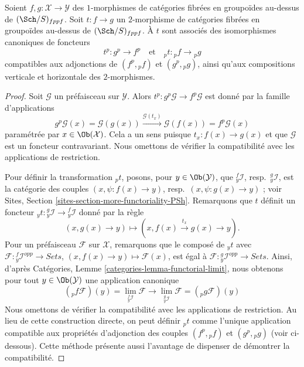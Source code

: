 \begin{lemma}
\label{lemma-2-morphisms-presheaves}
Soient $f, g : \mathcal{X} \to \mathcal{Y}$ des $1$-morphismes de catégories
fibrées en groupoïdes au-dessus de $(\Sch/S)_{fppf}$. Soit $t : f \to g$
un $2$-morphisme de catégories fibrées en groupoïdes au-dessus de
$(\Sch/S)_{fppf}$. À $t$ sont associés des
isomorphismes canoniques de foncteurs
$$
t^p : g^p \longrightarrow f^p
\quad\text{et}\quad
{}_pt : {}_pf \longrightarrow {}_pg
$$
compatibles aux adjonctions de $(f^p, {}_pf)$ et
$(g^p, {}_pg)$, ainsi qu'aux
compositions verticale et horizontale des $2$-morphismes.
\end{lemma}

\begin{proof}
Soit $\mathcal{G}$ un préfaisceau sur $\mathcal{Y}$. Alors
$t^p : g^p\mathcal{G} \to f^p\mathcal{G}$ est donné par la famille
d'applications
$$
g^p\mathcal{G}(x) = \mathcal{G}(g(x))
\xrightarrow{\mathcal{G}(t_x)}
\mathcal{G}(f(x)) = f^p\mathcal{G}(x)
$$
paramétrée par $x \in \Ob(\mathcal{X})$. Cela a un sens puisque
$t_x : f(x) \to g(x)$ et que $\mathcal{G}$ est un foncteur contravariant.
Nous omettons de vérifier la compatibilité avec les applications
de restriction.

\medskip\noindent
Pour définir la transformation ${}_pt$, posons, pour $y \in \Ob(\mathcal{Y})$,
que ${}_y^f\mathcal{I}$, resp.\ ${}_y^g\mathcal{I}$, est la catégorie
des couples $(x, \psi : f(x) \to y)$, resp.\ $(x, \psi : g(x) \to y)$ ; voir
Sites, Section \ref{sites-section-more-functoriality-PSh}.
Remarquons que $t$ définit un foncteur
${}_yt : {}_y^g\mathcal{I} \to {}_y^f\mathcal{I}$
donné par la règle
$$
(x, g(x) \to y) \longmapsto (x, f(x) \xrightarrow{t_x} g(x) \to y).
$$
Pour un préfaisceau $\mathcal{F}$ sur $\mathcal{X}$, remarquons que le composé
de ${}_yt$ avec $\mathcal{F} : {}_y^f\mathcal{I}^{opp} \to \textit{Sets}$,
$(x, f(x) \to y) \mapsto \mathcal{F}(x)$, est égal à
$\mathcal{F} : {}_y^g\mathcal{I}^{opp} \to \textit{Sets}$. Ainsi, d'après
Catégories, Lemme \ref{categories-lemma-functorial-limit},
nous obtenons pour tout $y \in \Ob(\mathcal{Y})$ une application canonique
$$
({}_pf\mathcal{F})(y) = \lim_{{}_y^f\mathcal{I}} \mathcal{F}
\longrightarrow
\lim_{{}_y^g\mathcal{I}} \mathcal{F} = ({}_pg\mathcal{F})(y)
$$
Nous omettons de vérifier la compatibilité avec les applications
de restriction. Au lieu de cette construction directe, on peut définir
${}_pt$ comme l'unique application compatible aux propriétés d'adjonction
des couples $(f^p, {}_pf)$ et $(g^p, {}_pg)$ (voir ci-dessous). Cette méthode
présente aussi l'avantage de dispenser de démontrer la compatibilité.


\end{proof}
